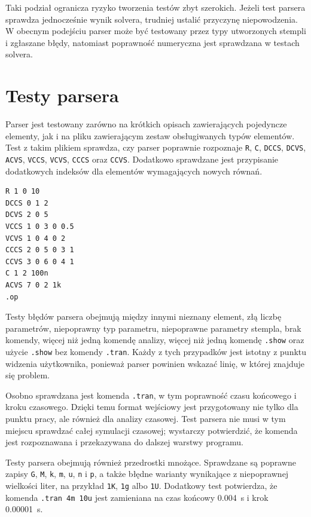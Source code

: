 Taki podział ogranicza ryzyko tworzenia testów zbyt szerokich. Jeżeli test parsera sprawdza jednocześnie wynik solvera, trudniej ustalić przyczynę niepowodzenia. W obecnym podejściu parser może być testowany przez typy utworzonych stempli i zgłaszane błędy, natomiast poprawność numeryczna jest sprawdzana w testach solvera.

\section{Testy parsera}
\label{sec:testy-parsera}

Parser jest testowany zarówno na krótkich opisach zawierających pojedyncze elementy, jak i na pliku zawierającym zestaw obsługiwanych typów elementów. Test z takim plikiem sprawdza, czy parser poprawnie rozpoznaje \texttt{R}, \texttt{C}, \texttt{DCCS}, \texttt{DCVS}, \texttt{ACVS}, \texttt{VCCS}, \texttt{VCVS}, \texttt{CCCS} oraz \texttt{CCVS}. Dodatkowo sprawdzane jest przypisanie dodatkowych indeksów dla elementów wymagających nowych równań.

\begin{lstlisting}[language=Netlist,caption={Przykładowy plik używany do sprawdzenia parsera},label={lst:test-all-elements}]
R 1 0 10
DCCS 0 1 2
DCVS 2 0 5
VCCS 1 0 3 0 0.5
VCVS 1 0 4 0 2
CCCS 2 0 5 0 3 1
CCVS 3 0 6 0 4 1
C 1 2 100n
ACVS 7 0 2 1k
.op
\end{lstlisting}

Testy błędów parsera obejmują między innymi nieznany element, złą liczbę parametrów, niepoprawny typ parametru, niepoprawne parametry stempla, brak komendy, więcej niż jedną komendę analizy, więcej niż jedną komendę \texttt{.show} oraz użycie \texttt{.show} bez komendy \texttt{.tran}. Każdy z tych przypadków jest istotny z punktu widzenia użytkownika, ponieważ parser powinien wskazać linię, w której znajduje się problem.

Osobno sprawdzana jest komenda \texttt{.tran}, w tym poprawność czasu końcowego i kroku czasowego. Dzięki temu format wejściowy jest przygotowany nie tylko dla punktu pracy, ale również dla analizy czasowej. Test parsera nie musi w tym miejscu sprawdzać całej symulacji czasowej; wystarczy potwierdzić, że komenda jest rozpoznawana i przekazywana do dalszej warstwy programu.

Testy parsera obejmują również przedrostki mnożące. Sprawdzane są poprawne zapisy \texttt{G}, \texttt{M}, \texttt{k}, \texttt{m}, \texttt{u}, \texttt{n} i \texttt{p}, a także błędne warianty wynikające z niepoprawnej wielkości liter, na przykład \texttt{1K}, \texttt{1g} albo \texttt{1U}. Dodatkowy test potwierdza, że komenda \texttt{.tran 4m 10u} jest zamieniana na czas końcowy \SI{0.004}{\second} i krok \SI{0.00001}{\second}.

